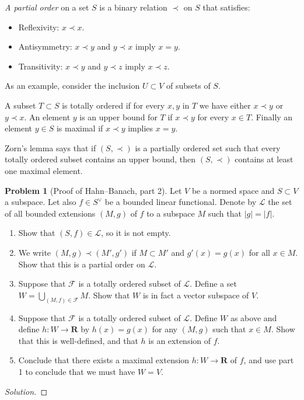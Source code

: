\documentclass[11pt]{article}
\theoremstyle{definition}
\newtheorem{prob}{Problem}
\newcommand{\kk}[1]{\mathbf{#1}}
\newcommand{\cc}[1]{\mathcal{#1}}
\begin{document}
\emph{A partial order} on a set $S$ is a binary relation $\prec$
on $S$ that satisfies:
\begin{itemize}
\item
Reflexivity: $x \prec x$.

\item
Antisymmetry:
$x \prec y$ and $y \prec x$ imply $x = y$.

\item
Transitivity:
$x \prec y$ and $y \prec z$ imply $x \prec z$.
\end{itemize}
As an example, consider the inclusion $U \subset V$ of subsets of $S$.

A subset $T \subset S$ is totally ordered if for every $x,y$ in $T$ we have
either $x \prec y$ or $y \prec x$.
An element $y$ is an upper bound for $T$ if $x \prec y$ for every $x \in T$.
Finally an element $y \in S$ is maximal if $x \prec y$ implies $x = y$.

Zorn's lemma says that if $(S,\prec)$ is a partially ordered set such that
every totally ordered subset contains an upper bound, then $(S,\prec)$ contains
at least one maximal element.


\begin{prob}[Proof of Hahn--Banach, part 2]
Let $V$ be a normed space and $S \subset V$ a subspace.
Let also $f \in S^\vee$ be a bounded linear functional.
Denote by $\cc L$ the set of all bounded extensions $(M, g)$ of $f$ to a
subspace $M$ such that $|g| = |f|$.

\begin{enumerate}
\item
Show that $(S, f) \in \cc L$, so it is not empty.

\item
We write $(M,g) \prec (M',g')$ if $M \subset M'$ and $g'(x) = g(x)$ for all $x
\in M$.
Show that this is a partial order on $\cc L$.

\item
Suppose that $\cc F$ is a totally ordered subset of $\cc L$.
Define a set $W = \bigcup_{(M,f) \in \cc F} M$.
Show that $W$ is in fact a vector subspace of $V$.

\item
Suppose that $\cc F$ is a totally ordered subset of $\cc L$.
Define $W$ as above and define $h : W \to \kk R$ by
\(
h(x) = g(x)
\)
for any $(M,g)$ such that $x \in M$.
Show that this is well-defined, and that $h$ is an extension of $f$.

\item
Conclude that there exists a maximal extension $h : W \to \kk R$ of $f$,
and use part 1 to conclude that we must have $W = V$.
\end{enumerate}
\end{prob}

\begin{proof}[Solution]
\end{proof}
\end{document}
